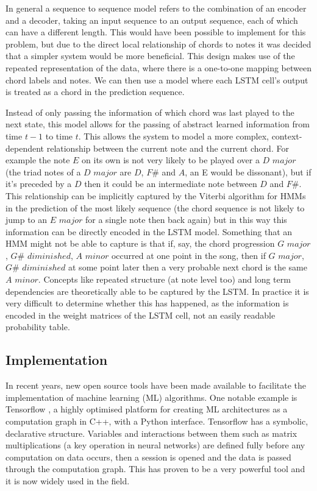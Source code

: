 \documentclass[bsc,singlespacing,logo, parskip, deptreport]{infthesis}
\begin{document}
In general a sequence to sequence model refers to the combination of an encoder and a decoder, taking an input sequence to an output sequence, each of which can have a different length. This would have been possible to implement for this problem, but due to the direct local relationship of chords to notes it was decided that a simpler system would be more beneficial. This design makes use of the repeated representation of the data, where there is a one-to-one mapping between chord labels and notes. We can then use a model where each LSTM cell's output is treated as a chord in the prediction sequence.

Instead of only passing the information of which chord was last played to the next state, this model allows for the passing of abstract learned information from time $t-1$ to time $t$. This allows the system to model a more complex, context-dependent relationship between the current note and the current chord. For example the note $E$ on its own is not very likely to be played over a $D$ $major$ (the triad notes of a $D$ $major$ are $D$, $F\#$ and $A$, an E would be dissonant), but if it's preceded by a $D$ then it could be an intermediate note between $D$ and $F\#$. This relationship can be implicitly captured by the Viterbi algorithm for HMMs in the prediction of the most likely sequence (the chord sequence is not likely to jump to an $E$ $major$ for a single note then back again) but in this way this information can be directly encoded in the LSTM model. Something that an HMM might not be able to capture is that if, say, the chord progression $G$ $major$, $G\#$ $diminished$, $A$ $minor$ occurred at one point in the song, then if $G$ $major$, $G\#$ $diminished$ at some point later then a very probable next chord is the same $A$ $minor$. Concepts like repeated structure (at note level too) and long term dependencies are theoretically able to be captured by the LSTM. In practice it is very difficult to determine whether this has happened, as the information is encoded in the weight matrices of the LSTM cell, not an easily readable probability table.

\subsection{Implementation} \label{LSTM IMP}

In recent years, new open source tools have been made available to facilitate the implementation of machine learning (ML) algorithms. One notable example is Tensorflow \cite{tensorflow2015-whitepaper}, a highly optimised platform for creating ML architectures as a computation graph in C++, with a Python interface. Tensorflow has a symbolic, declarative structure. Variables and interactions between them such as matrix multiplications (a key operation in neural networks) are defined fully before any computation on data occurs, then a session is opened and the data is passed through the computation graph. This has proven to be a very powerful tool and it is now widely used in the field.
\end{document}
